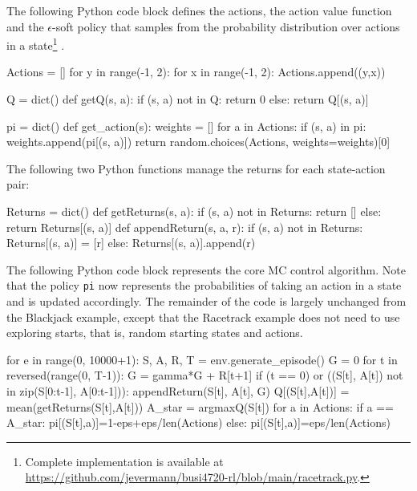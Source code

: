 The following Python code block defines the actions, the action value function and the $\epsilon$-soft policy that samples from the probability distribution over actions in a state\footnote{Complete implementation is available at \url{https://github.com/jevermann/busi4720-rl/blob/main/racetrack.py}.}
. 

\begin{pythoncode}
Actions = []
for y in range(-1, 2):
    for x in range(-1, 2):
        Actions.append((y,x))

Q = dict()
def getQ(s, a):
    if (s, a) not in Q:
        return 0
    else:
        return Q[(s, a)]

pi = dict()
def get_action(s):
    weights = []
    for a in Actions:
        if (s, a) in pi:
            weights.append(pi[(s, a)])
    return random.choices(Actions, weights=weights)[0]
\end{pythoncode}

The following two Python functions manage the returns for each state-action pair:

\begin{samepage}
\begin{pythoncode}
Returns = dict()
def getReturns(s, a):
    if (s, a) not in Returns:
        return []
    else:
        return Returns[(s, a)]
def appendReturn(s, a, r):
    if (s, a) not in Returns:
        Returns[(s, a)] = [r]
    else:
        Returns[(s, a)].append(r)
\end{pythoncode}
\end{samepage}

The following Python code block represents the core MC control algorithm. Note that the policy \texttt{pi} now represents the probabilities of taking an action in a state and is updated accordingly. The remainder of the code is largely unchanged from the Blackjack example, except that the Racetrack example does not need to use exploring starts, that is, random starting states and actions.

\begin{samepage}
\begin{pythoncode}
for e in range(0, 10000+1):
    S, A, R, T = env.generate_episode()
    G = 0
    for t in reversed(range(0, T-1)):
        G = gamma*G + R[t+1]
        if (t == 0) or ((S[t], A[t]) not in zip(S[0:t-1], A[0:t-1])):
            appendReturn(S[t], A[t], G)
            Q[(S[t],A[t])] = mean(getReturns(S[t],A[t]))
            A_star = argmaxQ(S[t])
            for a in Actions:
                if a == A_star:
                    pi[(S[t],a)]=1-eps+eps/len(Actions)
                else:
                    pi[(S[t],a)]=eps/len(Actions)
\end{pythoncode}
\end{samepage}

